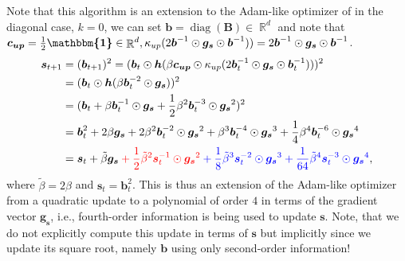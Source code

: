 \documentclass[a4paper, 11pt, oneside]{scrartcl}
\theoremstyle{break}
\DeclareMathOperator{\Real}{\mathbb{R}}
\DeclareMathOperator{\diag}{diag}
\newcommand{\matr}[1]{\boldsymbol{#1}}
\numberwithin{equation}{section}
\begin{document}
				Note that this algorithm is an extension to the Adam-like optimizer of \cite{LSK20} in the diagonal case, $k = 0$, we can set $\matr{b} = \diag(\matr{B}) \in \Real^d$ and note that $\matr{c_{up}} = \frac{1}{2} \matr{\mathbbm{1}} \in \Real^d, \kappa_{up}(2\matr{b}^{-1} \odot \matr{g_s} \odot \matr{b}^{-1})) = 2 \matr{b}^{-1} \odot \matr{g_s} \odot \matr{b}^{-1}$.
				\begin{align*}
					\matr{s}_{t+1} & = (\matr{b}_{t+1})^2 = (\matr{b}_t \odot \matr{h}(\beta \matr{c_{up}} \odot \kappa_{up} (2 \matr{b}_t^{-1} \odot \matr{g_s} \odot \matr{b}_t^{-1})))^2 \\
					&= (\matr{b}_t \odot \matr{h}(\beta \matr{b}_t^{-2} \odot \matr{g_s}))^2 \\
					&= (\matr{b}_t + \beta \matr{b}_t^{-1} \odot \matr{g_s} + \frac{1}{2} \beta^2 \matr{b}_t^{-3} \odot \matr{g_s}^2)^2 \\
					&= \matr{b}_t^2 + 2\beta \matr{g_s} + 2 \beta^2 \matr{b}_t^{-2} \odot \matr{g_s}^2 + \beta^3 \matr{b}_t^{-4} \odot \matr{g_s}^3 + \frac{1}{4} \beta^4 \matr{b}_t^{-6} \odot \matr{g_s}^4 \\
					&= \matr{s}_t + \tilde{\beta} \matr{g_s} \color{red} + \frac{1}{2} \tilde{\beta}^2 \matr{s}_t^{-1} \odot \matr{g_s}^2 \color{blue} + \frac{1}{8} \tilde{\beta}^3 \matr{s}_t^{-2} \odot \matr{g_s}^3 + \frac{1}{64} \tilde{\beta}^4 \matr{s}_t^{-3} \odot \matr{g_s}^4 \color{black},
				\end{align*}
				where $\tilde{\beta} = 2 \beta$ and $\matr{s}_t = \matr{b}_t^2$.
				This is thus an extension of the Adam-like optimizer from a quadratic update to a polynomial of order $4$ in terms of the gradient vector $\matr{g_s}$, i.e., fourth-order information is being used to update $\matr{s}$. 
				Note, that we do not explicitly compute this update in terms of $\matr{s}$ but implicitly since we update its square root, namely $\matr{b}$ using only second-order information!
\end{document}
